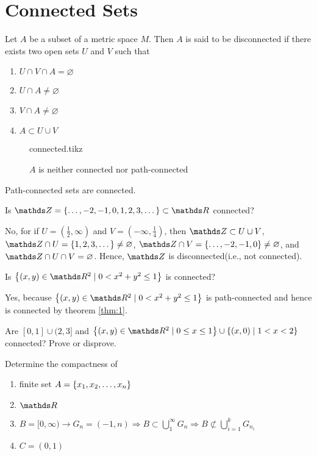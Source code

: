 \documentclass[../main-sheet.tex]{subfiles}
\begin{document}
\section{Connected Sets}
\begin{defn}
    Let $ A $ be a subset of a metric space $ M $. Then $ A $ is said to be disconnected if there exists two open sets $ U $ and $ V $ such that
    \begin{enumerate}[label=(\roman*)]
        \item $ U\cap V\cap A=\varnothing $
        \item $ U\cap A\neq \varnothing $
        \item $ V\cap A\neq \varnothing $
        \item $ A\subset U\cup V $
    \end{enumerate}
\end{defn}
\begin{figure}[H]
    \centering
    {connected.tikz}
    \caption{$ A $ is neither connected nor path-connected}
\end{figure}
\begin{thm}
    \label{thm:1}
    Path-connected sets are connected.
\end{thm}
\begin{prob}
    Is $ \Z=\set{\dots,-2,-1,0,1,2,3,\dots}\subset \R  $ connected?
\end{prob}
\begin{soln}
    No, for if $ U=(\frac{1}{2},\infty) $ and $ V=(-\infty,\frac{1}{4}) $, then $ \Z\subset U\cup V $, $ \Z \cap U=\set{1,2,3,\dots}\neq \varnothing $, $ \Z\cap V=\set{\dots,-2,-1,0}\neq \varnothing $, and $ \Z \cap U\cap V=\varnothing $. Hence, $ \Z $ is disconnected(i.e., not connected).
\end{soln}
\newpage
\begin{prob}
    Is $ \set{(x,y)\in \R^2\mid 0<x^2+y^2\leq 1} $ is connected?
\end{prob}
\begin{soln}
    Yes, because $ \set{(x,y)\in\R^2\mid 0<x^2+y^2\leq1} $ is path-connected and hence is connected by theorem \ref{thm:1}.
\end{soln}
\begin{ex}[H.W.]
    Are $ [0,1]\cup(2,3] $ and $ \set{(x,y)\in\R^2\mid 0\leq x\leq 1}\cup \set{(x,0)\mid 1<x<2}  $ connected? Prove or disprove.
\end{ex}
\begin{prob}
    Determine the compactness of
    \begin{enumerate}[label=(\roman*)]
        \item finite set $ A=\left\{x_1,x_2,\dots,x_n\right\} $
        \item $ \R $
        \item $ B=[0,\infty)\to G_n=(-1,n)\Rightarrow B\subset \bigcup_1^\infty G_n \Rightarrow B\not\subset \bigcup_{i=1}^k G_{n_i}$
        \item $ C=(0,1) $
    \end{enumerate}
\end{prob}
\end{document}
